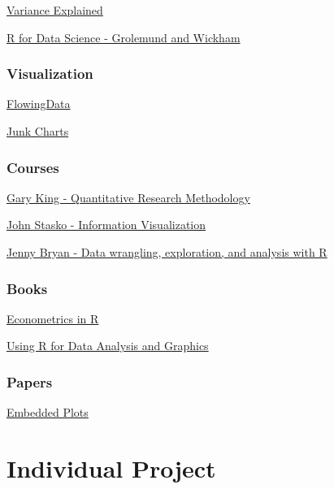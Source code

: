 \documentclass[]{book}
\theoremstyle{definition}
\theoremstyle{definition}
\theoremstyle{remark}
\begin{document}
\href{http://varianceexplained.org/RData/resources/}{Variance Explained}

\href{http://r4ds.had.co.nz/}{R for Data Science - Grolemund and
Wickham}

\subsection*{Visualization}\label{visualization}

\href{}{FlowingData}

\href{http://junkcharts.typepad.com/}{Junk Charts}

\subsection*{Courses}\label{courses}

\href{http://projects.iq.harvard.edu/gov2001/}{Gary King - Quantitative
Research Methodology}

\href{http://www.cc.gatech.edu/~stasko/7450/}{John Stasko - Information
Visualization}

\href{http://stat545.com/}{Jenny Bryan - Data wrangling, exploration,
and analysis with R}

\subsection*{Books}\label{books}

\href{https://cran.r-project.org/doc/contrib/Farnsworth-EconometricsInR.pdf}{Econometrics
in R}

\href{ftp://cran.r-project.org/pub/R/doc/contrib/usingR.pdf}{Using R for
Data Analysis and Graphics}

\subsection*{Papers}\label{papers}

\href{http://vita.had.co.nz/papers/embedded-plots.pdf}{Embedded Plots}

\chapter*{Individual Project}\label{individual-project-1}
\end{document}
